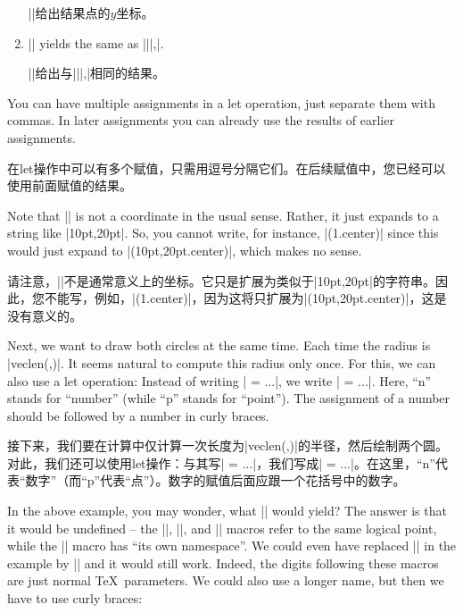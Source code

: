 \begin{paracol}{2}
\begin{enumerate}
    |\y|给出结果点的$y$坐标。
    \item |\p| yields the same as
        |\x||,\y|.

|\p|给出与|\x||,\y|相同的结果。
\end{enumerate}
%
You can have multiple assignments in a let operation, just separate them with
commas. In later assignments you can already use the results of earlier
assignments.

在let操作中可以有多个赋值，只需用逗号分隔它们。在后续赋值中，您已经可以使用前面赋值的结果。

Note that || is not a coordinate in the usual sense. Rather, it just expands
to a string like |10pt,20pt|. So, you cannot write, for instance,
|(\p1.center)| since this would just expand to |(10pt,20pt.center)|, which
makes no sense.

请注意，||不是通常意义上的坐标。它只是扩展为类似于|10pt,20pt|的字符串。因此，您不能写，例如，|(\p1.center)|，因为这将只扩展为|(10pt,20pt.center)|，这是没有意义的。

Next, we want to draw both circles at the same time. Each time the radius is
|veclen(,)|. It seems natural to compute this radius only once. For this,
we can also use a let operation: Instead of writing | = ...|, we write
| = ...|. Here, ``n'' stands for ``number'' (while ``p'' stands for
``point''). The assignment of a number should be followed by a number in curly
braces.

接下来，我们要在计算中仅计算一次长度为|veclen(,)|的半径，然后绘制两个圆。对此，我们还可以使用let操作：与其写| = ...|，我们写成| = ...|。在这里，“n”代表“数字”（而“p”代表“点”）。数字的赋值后面应跟一个花括号中的数字。

\begin{codeexample}[preamble={\usetikzlibrary{calc}}]
\end{codeexample}
%
In the above example, you may wonder, what || would yield? The answer is
that it would be undefined -- the |\p|, |\x|, and |\y| macros refer to the same
logical point, while the |\n| macro has ``its own namespace''. We could even
have replaced || in the example by || and it would still work. Indeed,
the digits following these macros are just normal \TeX\ parameters. We could
also use a longer name, but then we have to use curly braces:


\end{paracol}
